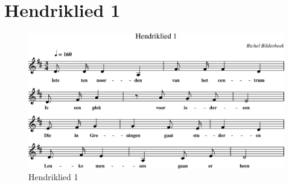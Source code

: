 \chapter{Hendriklied 1}



\begin{figure}[!htbp]
  \includegraphics[width=\textwidth,height=\textheight,keepaspectratio]{../songs/09_hendriklied_1.png}
  \caption{Hendriklied 1}
  \label{fig:09_hendriklied_1}
\end{figure}

